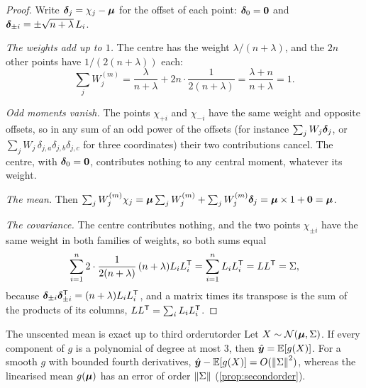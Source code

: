 \begin{proof}
Write $\bm{\delta}_j=\chi_j-\bm{\mu}$ for the offset of each point:
$\bm{\delta}_0=\bm{0}$ and $\bm{\delta}_{\pm i}=\pm\sqrt{n+\lambda}\,L_i$.

\emph{The weights add up to $1$.} The centre has the weight
$\lambda/(n+\lambda)$, and the $2n$ other points have
$1/(2(n+\lambda))$ each:
\[
  \sum_jW^{(m)}_j=\frac{\lambda}{n+\lambda}+2n\cdot\frac1{2(n+\lambda)}
  =\frac{\lambda+n}{n+\lambda}=1 .
\]

\emph{Odd moments vanish.} The points $\chi_{+i}$ and $\chi_{-i}$ have the
same weight and opposite offsets, so in any sum of an odd power of the
offsets (for instance $\sum_jW_j\bm{\delta}_j$, or
$\sum_jW_j\,\delta_{j,a}\delta_{j,b}\delta_{j,c}$ for three coordinates)
their two contributions cancel. The centre, with $\bm{\delta}_0=\bm{0}$,
contributes nothing to any central moment, whatever its weight.

\emph{The mean.} Then
$\sum_jW^{(m)}_j\chi_j=\bm{\mu}\sum_jW^{(m)}_j+\sum_jW^{(m)}_j\bm{\delta}_j
=\bm{\mu}\times1+\bm{0}=\bm{\mu}$.

\emph{The covariance.} The centre contributes nothing, and the two points
$\chi_{\pm i}$ have the same weight in both families of weights, so both
sums equal
\[
  \sum_{i=1}^n2\cdot\frac{1}{2(n+\lambda)}\,(n+\lambda)L_iL_i^{\mathsf{T}}
  =\sum_{i=1}^nL_iL_i^{\mathsf{T}}=LL^{\mathsf{T}}=\Sigma,
\]
because $\bm{\delta}_{\pm i}\bm{\delta}_{\pm i}^{\mathsf{T}}=(n+\lambda)L_iL_i^{\mathsf{T}}$,
and a matrix times its transpose is the sum of the products of its
columns, $LL^{\mathsf{T}}=\sum_iL_iL_i^{\mathsf{T}}$.
\end{proof}

\begin{theorem}{The unscented mean is exact up to third order}{utorder}
Let $X\sim\mathcal{N}(\bm{\mu},\Sigma)$. If every component of $g$ is a
polynomial of degree at most $3$, then $\hat{\bm{y}}=\mathbb{E}[g(X)]$. For a smooth
$g$ with bounded fourth derivatives, $\hat{\bm{y}}-\mathbb{E}[g(X)]=O(\left\lVert \Sigma\right\rVert^2)$,
whereas the linearised mean $g(\bm{\mu})$ has an error of order
$\left\lVert \Sigma\right\rVert$ (\cref{prop:secondorder}).
\end{theorem}

